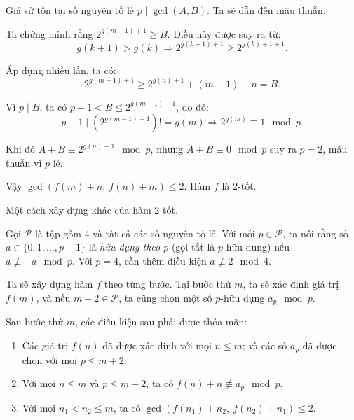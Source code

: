 \begin{problem}
\begin{soln}
    Giả sử tồn tại số nguyên tố lẻ \( p \mid \gcd(A,B) \). Ta sẽ dẫn đến mâu thuẫn.

    Ta chứng minh rằng \( 2^{g(m-1)+1} \ge B \). Điều này được suy ra từ:
    \[
        g(k+1) > g(k) \Rightarrow 2^{g(k+1)+1} \ge 2^{g(k)+1+1}.
    \]

    Áp dụng nhiều lần, ta có:
    \[
        2^{g(m-1)+1} \ge 2^{g(n)+1} + (m - 1) - n = B.
    \]

    Vì \( p \mid B \), ta có \( p - 1 < B \le 2^{g(m-1)+1} \), do đó:
    \[
        p - 1 \mid (2^{g(m-1)+1})! = g(m) \Rightarrow 2^{g(m)} \equiv 1 \mod p.
    \]

    Khi đó \( A + B \equiv 2^{g(n)+1} \mod p \), nhưng \( A + B \equiv 0 \mod p \) suy ra \( p = 2 \), mâu thuẫn vì \( p \) lẻ.

    Vậy \( \gcd(f(m) + n,\ f(n) + m) \le 2 \). Hàm \( f \) là 2-tốt.
\end{soln}

\begin{soln}
    Một cách xây dựng khác của hàm 2-tốt.

    Gọi \( \mathcal{P} \) là tập gồm 4 và tất cả các số nguyên tố lẻ.
    Với mỗi \( p \in \mathcal{P} \), ta nói rằng số \( a \in \{0, 1, \ldots, p - 1\} \) là \textit{hữu dụng theo \( p \)}
    (gọi tắt là \( p \)-hữu dụng) nếu \( a \not\equiv -a \mod p \). Với \( p = 4 \), cần thêm điều kiện \( a \not\equiv 2 \mod 4 \).

    Ta sẽ xây dựng hàm \( f \) theo từng bước. Tại bước thứ \( m \), ta sẽ xác định giá trị \( f(m) \),
    và nếu \( m + 2 \in \mathcal{P} \), ta cũng chọn một số \( p \)-hữu dụng \( a_p \mod p \).

    Sau bước thứ \( m \), các điều kiện sau phải được thỏa mãn:

    \begin{enumerate}[topsep=0pt, partopsep=0pt, itemsep=0pt, label=(\roman*)]
        \item Các giá trị \( f(n) \) đã được xác định với mọi \( n \le m \); và các số \( a_p \) đã được chọn với mọi \( p \le m + 2 \).
        \item Với mọi \( n \le m \) và \( p \le m + 2 \), ta có \( f(n) + n \not\equiv a_p \mod p \).
        \item Với mọi \( n_1 < n_2 \le m \), ta có \( \gcd(f(n_1) + n_2,\ f(n_2) + n_1) \le 2 \).
    \end{enumerate}


\end{soln}
\end{problem}
